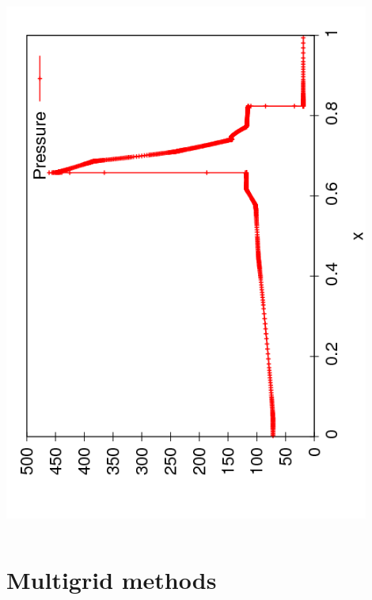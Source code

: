 \documentclass{beamer}
\begin{document}
\begin{frame}
\begin{columns}
\begin{column}{0.5\textwidth}
\begin{overlayarea}{\textwidth}{0.9\textheight}
{          \includegraphics[angle=-90,width=0.9\textwidth]{figures/AMR_Pressure_300}
        }
      \end{overlayarea}
    \end{column}
  \end{columns}

\end{frame}

\section{Multigrid methods}
\end{document}
